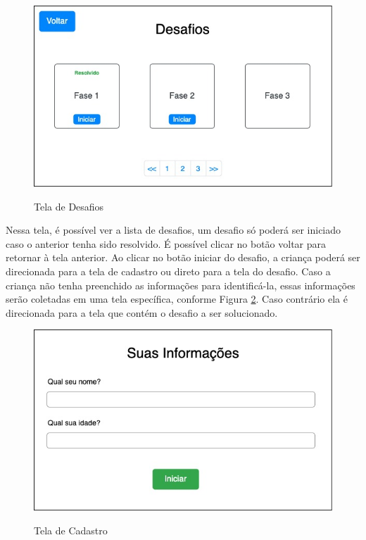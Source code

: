     \begin{figure}[H]
        \caption{Tela de Desafios}
        \centering
        \includegraphics[width=\linewidth]{Imagens/Cap3/tela_desafios.jpg}
        \label{figura:tela_desafios}
    \end{figure}
    
    Nessa tela, é possível ver a lista de desafios, um desafio só poderá ser iniciado caso o anterior tenha sido resolvido.
    É possível clicar no botão voltar para retornar à tela anterior. Ao clicar no botão iniciar do desafio, a criança poderá ser direcionada para a tela de cadastro ou direto para a tela do desafio. Caso a criança não tenha preenchido as informações para identificá-la, essas informações serão coletadas em uma tela específica, conforme Figura \ref{figura:cadastro}. Caso contrário ela é direcionada para a tela que contém o desafio a ser solucionado.
    
    \begin{figure}[H]
        \caption{Tela de Cadastro}
        \centering
        \includegraphics[width=\linewidth]{Imagens/Cap3/informacoes_usuario.jpg}
        \label{figura:cadastro}
    \end{figure}
    
